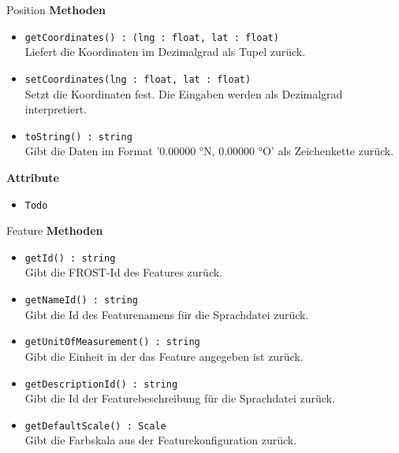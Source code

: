     \begin{Class}{Position}
        \textbf{Methoden}
        \begin{itemize}
            \item \texttt{getCoordinates() : (lng : float, lat : float)}
            \\ Liefert die Koordinaten im Dezimalgrad als Tupel zurück.
            \item \texttt{setCoordinates(lng : float, lat : float)}
            \\ Setzt die Koordinaten fest. Die Eingaben werden als Dezimalgrad interpretiert.

            \item \texttt{toString() : string}
            \\ Gibt die Daten im Format '0.00000 °N, 0.00000 °O' als Zeichenkette zurück.
        \end{itemize}
        
        \textbf{Attribute}
        \begin{itemize}
            \item \texttt{Todo}
        \end{itemize}
    \end{Class}

    \begin{Class}{Feature}
        \textbf{Methoden}
        \begin{itemize}
            \item \texttt{getId() : string}
            \\ Gibt die FROST-Id des Features zurück.
            \item \texttt{getNameId() : string}
            \\ Gibt die Id des Featurenamens für die Sprachdatei zurück.
            \item \texttt{getUnitOfMeasurement() : string}
            \\ Gibt die Einheit in der das Feature angegeben ist zurück.
            \item \texttt{getDescriptionId() : string}
            \\ Gibt die Id der Featurebeschreibung für die Sprachdatei zurück.
            \item \texttt{getDefaultScale() : Scale}
            \\ Gibt die Farbskala aus der Featurekonfiguration zurück.
        \end{itemize}
    \end{Class}

